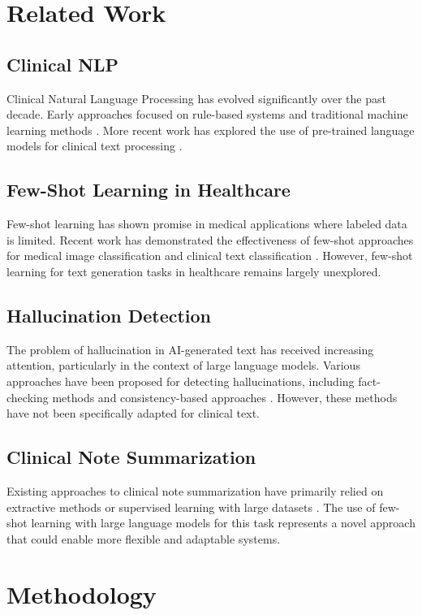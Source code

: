 \documentclass[sigconf]{acmart}
\begin{document}
\section{Related Work}
\label{sec:related_work}

\subsection{Clinical NLP}
Clinical Natural Language Processing has evolved significantly over the past decade. Early approaches focused on rule-based systems and traditional machine learning methods \cite{wang2018}. More recent work has explored the use of pre-trained language models for clinical text processing \cite{lee2020}.

\subsection{Few-Shot Learning in Healthcare}
Few-shot learning has shown promise in medical applications where labeled data is limited. Recent work has demonstrated the effectiveness of few-shot approaches for medical image classification \cite{wang2021} and clinical text classification \cite{zhang2022}. However, few-shot learning for text generation tasks in healthcare remains largely unexplored.

\subsection{Hallucination Detection}
The problem of hallucination in AI-generated text has received increasing attention, particularly in the context of large language models. Various approaches have been proposed for detecting hallucinations, including fact-checking methods \cite{liu2022} and consistency-based approaches \cite{zhang2023}. However, these methods have not been specifically adapted for clinical text.

\subsection{Clinical Note Summarization}
Existing approaches to clinical note summarization have primarily relied on extractive methods or supervised learning with large datasets \cite{zhang2021}. The use of few-shot learning with large language models for this task represents a novel approach that could enable more flexible and adaptable systems.

\section{Methodology}
\label{sec:methodology}
\end{document}
